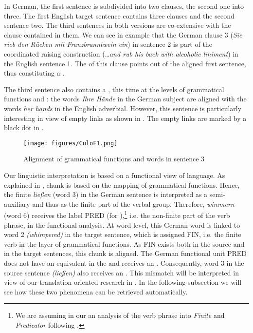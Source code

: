 \documentclass[output=paper]{LSP/langsci}
\begin{document}
In German, the first sentence is subdivided into two clauses, the second one into three. The first English target sentence contains three clauses and the second sentence two. The third sentences in both versions are co-extensive with the clause contained in them. We can see in example  that the German clause 3 (\textit{Sie rieb den Rücken mit Franzbranntwein ein}) in sentence 2 is part of the coordinated raising construction (\ldots\textit{and rub his back with alcoholic liniment}) in the English sentence 1. The  of this clause points out of the aligned first sentence, thus constituting a . 

The third sentence also contains a , this time at the levels of grammatical functions and : the words \textit{Ihre Hände} in the German subject are aligned with the words \textit{her hands} in the English adverbial. However, this sentence is particularly interesting in view of empty links as shown in \citet{Hansen-SchirraEtAl2006}. The empty links are marked by a black dot in .

\begin{figure}
\texttt{[image: figures/CuloF1.png]}
\caption{Alignment of grammatical functions and words in sentence 3}
\label{fig:culo:1}
\end{figure}

Our linguistic interpretation is based on a functional view of language. As explained in , chunk  is based on the mapping of grammatical functions. Hence, the finite \textit{ließen} (word 3) in the German sentence is interpreted as a semi-auxiliary and thus as the finite part of the verbal group. Therefore, \textit{wimmern} (word 6) receives the label PRED (for ),\footnote{We are assuming in our  an analysis of the verb phrase into \textit{Finite} and \textit{Predicator} following \citealt[78ff]{halliday_introduction_1985}.} i.e. the non-finite part of the verb phrase, in the functional analysis. At word level, this German word is linked to word 2 \textit{(whimpered)} in the target sentence, which is assigned FIN, i.e. the finite verb in the layer of grammatical functions. As FIN exists both in the source and in the target sentences, this chunk is aligned. The German functional unit PRED does not have an equivalent in the  and receives an . Consequently, word 3 in the source sentence \textit{(ließen)} also receives an . This mismatch will be interpreted in view of our translation-oriented research in . In the following subsection we will see how these two phenomena can be retrieved automatically.
\end{document}
